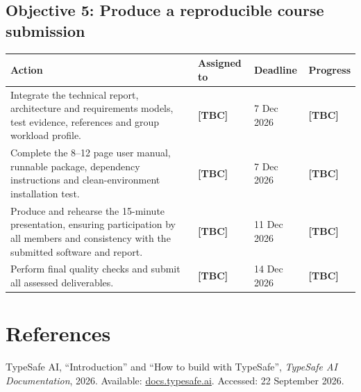 \documentclass[12pt,a4paper]{article}
\newcommand{\placeholder}[1]{\textcolor{Placeholder}{\textbf{[#1]}}}
\begin{document}
\subsection*{Objective 5: Produce a reproducible course submission}

\begin{longtable}{@{}p{}p{}p{}p{}@{}}
  \toprule
  \textbf{Action} & \textbf{Assigned to} & \textbf{Deadline} & \textbf{Progress} \\
  \midrule
  \endhead
  Integrate the technical report, architecture and requirements models, test evidence, references and group workload profile. & \placeholder{TBC} & 7 Dec 2026 & \placeholder{TBC} \\
  \midrule
  Complete the 8--12 page user manual, runnable package, dependency instructions and clean-environment installation test. & \placeholder{TBC} & 7 Dec 2026 & \placeholder{TBC} \\
  \midrule
  Produce and rehearse the 15-minute presentation, ensuring participation by all members and consistency with the submitted software and report. & \placeholder{TBC} & 11 Dec 2026 & \placeholder{TBC} \\
  \midrule
  Perform final quality checks and submit all assessed deliverables. & \placeholder{TBC} & 14 Dec 2026 & \placeholder{TBC} \\
  \bottomrule
\end{longtable}

\section*{References}

\begin{enumerate}[label={[\arabic*]},leftmargin=2.2em]
  \item TypeSafe AI, ``Introduction'' and ``How to build with TypeSafe'', \emph{TypeSafe AI Documentation}, 2026. Available: \href{https://docs.typesafe.ai/}{docs.typesafe.ai}. Accessed: 22 September 2026.
\end{enumerate}
\end{document}
